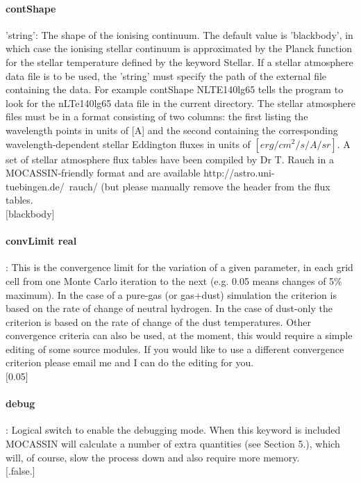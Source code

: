 \documentclass[11pt]{article}
\begin{document}
\paragraph   {contShape} 'string': The shape of the ionising continuum. The default value is 
		     'blackbody', in which case the ionising stellar continuum is 
		     approximated by the Planck function for the stellar 
		     temperature defined by the keyword Stellar. If a stellar 
		     atmosphere data file is to be used, the 'string' must specify 
		     the path of the external file containing the data. For example 
		     contShape NLTE140lg65 tells the program to look for the 
		     nLTe140lg65 data file in the current directory. The stellar 
		     atmosphere files must be in a format consisting of two columns:
		     the first listing the wavelength points in units of [A] and 
		     the second containing the corresponding wavelength-dependent 
		     stellar Eddington fluxes in units of $[erg/cm^2/s/A/sr]$. A set
		     of stellar atmosphere flux tables have been compiled by Dr T. Rauch
		     in a MOCASSIN-friendly format and are available  
		     http://astro.uni-tuebingen.de/~rauch/ (but please manually remove 
		     the header from the flux tables.\\
		     $[$blackbody$]$\\

\paragraph   {convLimit real}    : This is the convergence limit for the variation of a given 
                     parameter, in each grid cell from one Monte Carlo iteration to the 
		     next (e.g. 0.05 means changes of 5\% maximum). 
		     In the case of a pure-gas (or gas+dust) simulation the criterion 
		     is based on the rate of change of neutral hydrogen. In the case of 
		     dust-only the criterion is based on the rate of change of the 
		     dust temperatures. 
		     Other convergence criteria can also be used, at the moment, 
		     this would require a simple editing of some source modules. 
		     If you would like to use a different convergence criterion 
		     please email me and I can do the editing for you. \\
		     $[$0.05$]$\\

\paragraph   {debug}             : Logical switch to enable the debugging mode. When this 
		     keyword is included MOCASSIN will calculate a number of 
		     extra quantities (see Section 5.), which will, of course,
		     slow the process down and also require more memory. \\
		     $[$.false.$]$\\
\end{document}
